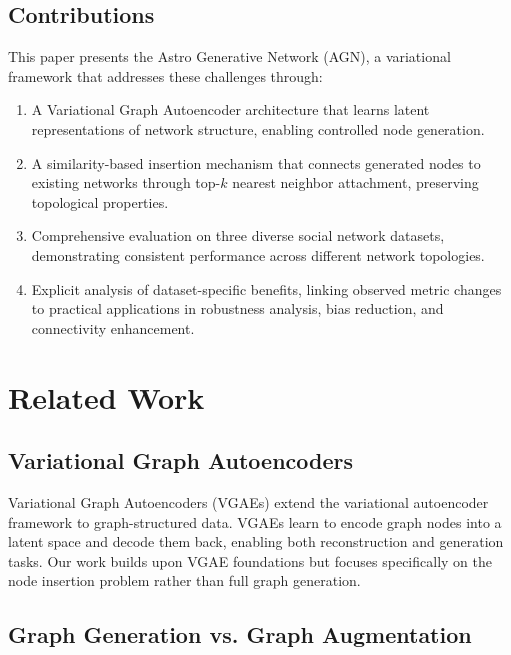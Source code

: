 \documentclass[12pt]{article}
\begin{document}
\subsection{Contributions}

This paper presents the Astro Generative Network (AGN), a variational framework that addresses these challenges through:

\begin{enumerate}
    \item A Variational Graph Autoencoder architecture that learns latent representations of network structure, enabling controlled node generation.
    
    \item A similarity-based insertion mechanism that connects generated nodes to existing networks through top-$k$ nearest neighbor attachment, preserving topological properties.
    
    \item Comprehensive evaluation on three diverse social network datasets, demonstrating consistent performance across different network topologies.
    
    \item Explicit analysis of dataset-specific benefits, linking observed metric changes to practical applications in robustness analysis, bias reduction, and connectivity enhancement.
\end{enumerate}

\section{Related Work}

\subsection{Variational Graph Autoencoders}

Variational Graph Autoencoders (VGAEs) \cite{kipf2016variational} extend the variational autoencoder framework \cite{kingma2013auto} to graph-structured data. VGAEs learn to encode graph nodes into a latent space and decode them back, enabling both reconstruction and generation tasks. Our work builds upon VGAE foundations but focuses specifically on the node insertion problem rather than full graph generation.

\subsection{Graph Generation vs. Graph Augmentation}
\end{document}
